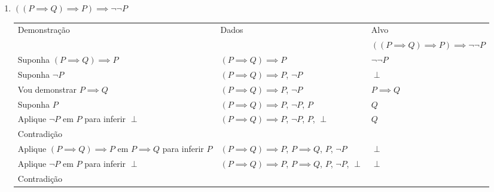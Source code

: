 \documentclass[a4paper, 12pt]{article}
\begin{document}
\begin{enumerate}
\begin{enumerate}[1.]
        \item $((P \implies Q) \implies P) \implies \neg\neg P$
        \begin{table}[h!]
            \centering
            \begin{tabular}{|p{4cm} | p{4cm} | p{4cm} |}
            \rowcolor{gray!50}
            Demonstração & Dados & Alvo \\
            & & $((P \implies Q) \implies P) \implies \neg \neg P$\\
            Suponha $(P \implies Q) \implies P$ & $(P \implies Q) \implies P$ & $\neg \neg P$\\
            Suponha $\neg P$ & $(P \implies Q) \implies P$, $\neg P$ & $\perp$ \\
            \rowcolor{red!25}
            Vou demonstrar $P \implies Q$ & $(P \implies Q) \implies P$, $\neg P$ & $P \implies Q$\\
            \rowcolor{red!25}
            Suponha $P$ & $(P \implies Q) \implies P$, $\neg P$, $P$ & $Q$ \\
            \rowcolor{red!25}
            Aplique $\neg P$ em $P$ para inferir $\perp$ & $(P \implies Q) \implies P$, $\neg P$, $P$, $\perp$ & $Q$\\
            \rowcolor{red!25}
            Contradição & & \\
            Aplique $(P \implies Q) \implies P$ em $P \implies Q$ para inferir $P$ & $(P \implies Q) \implies P$, $P \implies Q$, $P$, $\neg P$ & $\perp$\\
            Aplique $\neg P$ em $P$ para inferir $\perp$ & $(P \implies Q) \implies P$, $P \implies Q$, $P$, $\neg P$, $\perp$ & $\perp$\\
            Contradição & & \\
            \hline
            \end{tabular}
        \end{table}
    \end{enumerate}
\end{enumerate}
\end{document}
